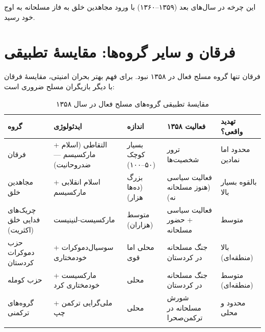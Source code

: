 \documentclass[12pt,a4paper]{book}
\begin{document}
این چرخه در سال‌های بعد (۱۳۵۹–۱۳۶۰) با ورود مجاهدین خلق به فاز مسلحانه به اوج خود رسید.

\section{فرقان و سایر گروه‌ها: مقایسهٔ تطبیقی}

فرقان تنها گروه مسلح فعال در ۱۳۵۸ نبود. برای فهم بهتر بحران امنیتی، مقایسهٔ فرقان با دیگر بازیگران مسلح ضروری است:

\begin{longtable}{%
    >{\raggedleft\arraybackslash}p{}
    >{\raggedleft\arraybackslash}p{}
    >{\raggedleft\arraybackslash}p{}
    >{\raggedleft\arraybackslash}p{}
    >{\raggedleft\arraybackslash}p{}}
\toprule
\rowcolor{cAccent!10}
\textbf{گروه} & \textbf{ایدئولوژی} & \textbf{اندازه} & \textbf{فعالیت ۱۳۵۸} & \textbf{تهدید واقعی؟} \\
\midrule
\endhead

فرقان &
التقاطی (اسلام + مارکسیسم — ضدروحانیت) &
بسیار کوچک (۵۰–۱۰۰) &
ترور شخصیت‌ها &
\textcolor{cWarn}{محدود اما نمادین} \\
\midrule

مجاهدین خلق &
اسلام انقلابی + مارکسیسم &
بزرگ (ده‌ها هزار) &
فعالیت سیاسی (هنوز مسلحانه نه) &
\textcolor{cAccent}{بالقوه بسیار بالا} \\
\midrule

چریک‌های فدایی خلق (اکثریت) &
مارکسیست-لنینیست &
متوسط (هزاران) &
فعالیت سیاسی + حضور مسلحانه &
\textcolor{cWarn}{متوسط} \\
\midrule

حزب دموکرات کردستان &
سوسیال‌دموکرات + خودمختاری &
محلی اما قوی &
جنگ مسلحانه در کردستان &
\textcolor{cAccent}{بالا (منطقه‌ای)} \\
\midrule

حزب کومله &
مارکسیست + خودمختاری کرد &
محلی &
جنگ مسلحانه در کردستان &
\textcolor{cWarn}{متوسط (منطقه‌ای)} \\
\midrule

گروه‌های ترکمنی &
ملی‌گرایی ترکمن + چپ &
محلی &
شورش مسلحانه در ترکمن‌صحرا &
\textcolor{cWarn}{محدود و محلی} \\

\bottomrule
\caption{مقایسهٔ تطبیقی گروه‌های مسلح فعال در سال ۱۳۵۸}
\label{tab:armed-groups}
\end{longtable}
\end{document}
